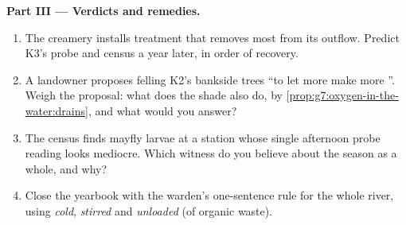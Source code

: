 \begin{problem}
\medskip\noindent\textbf{Part III --- Verdicts and
remedies.}
\begin{enumerate}[resume]
  \item The creamery installs treatment that removes most
         from its outflow. Predict K3's
        probe and census a year later, in order of
        recovery.
  \item A landowner proposes felling K2's bankside trees
        ``to let more  make more ''. Weigh the
        proposal: what does the shade also do, by
        \cref{prop:g7:oxygen-in-the-water:drains}, and
        what would you answer?
  \item The census finds mayfly larvae at a station whose
        single afternoon probe reading looks mediocre.
        Which witness do you believe about the season as
        a whole, and why?
  \item Close the yearbook with the warden's one-sentence
        rule for the whole river, using \emph{cold},
        \emph{stirred} and \emph{unloaded} (of organic
        waste).
\end{enumerate}
\end{problem}
